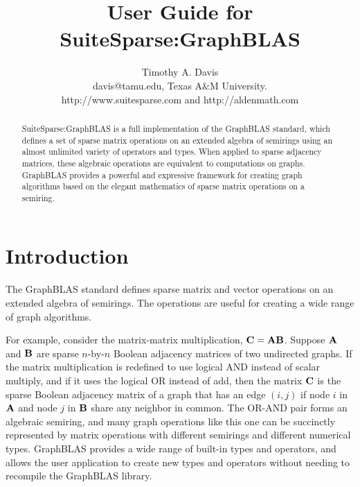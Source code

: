 \documentclass[12pt]{article}
\title{User Guide for SuiteSparse:GraphBLAS}
\author{Timothy A. Davis \\
\small
davis@tamu.edu, Texas A\&M University. \\
\small
http://www.suitesparse.com and http://aldenmath.com
}
\begin{document}
\maketitle

\begin{abstract}
SuiteSparse:GraphBLAS is a full implementation of the GraphBLAS standard,
which defines a set of sparse matrix operations on an extended algebra of
semirings using an almost unlimited variety of operators and types.  When
applied to sparse adjacency matrices, these algebraic operations are equivalent
to computations on graphs.  GraphBLAS provides a powerful and expressive
framework for creating graph algorithms based on the elegant mathematics of
sparse matrix operations on a semiring.
\end{abstract}

\newpage
{\small
\tableofcontents
}

\newpage
\section{Introduction} %
\label{intro}

The GraphBLAS standard defines sparse matrix and vector operations on an
extended algebra of semirings.  The operations are useful for creating a wide
range of graph algorithms.

For example, consider the matrix-matrix multiplication, ${\bf C=AB}$.  Suppose
${\bf A}$ and ${\bf B}$ are sparse $n$-by-$n$ Boolean adjacency matrices of two
undirected graphs.  If the matrix multiplication is redefined to use logical
AND instead of scalar multiply, and if it uses the logical OR instead of add,
then the matrix ${\bf C}$ is the sparse Boolean adjacency matrix of a graph
that has an edge $(i,j)$ if node $i$ in ${\bf A}$ and node $j$ in ${\bf B}$
share any neighbor in common.  The OR-AND pair forms an algebraic semiring, and
many graph operations like this one can be succinctly represented by matrix
operations with different semirings and different numerical types.  GraphBLAS
provides a wide range of built-in types and operators, and allows the user
application to create new types and operators without needing to recompile the
GraphBLAS library.
\end{document}
